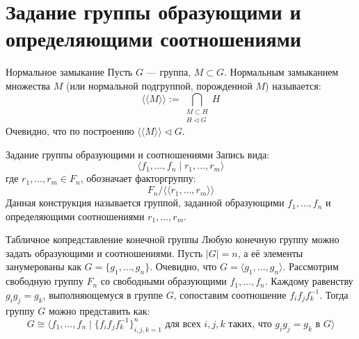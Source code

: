 
\section{Задание группы образующими и определяющими соотношениями}

\begin{Definition}{Нормальное замыкание}{}
	Пусть $G$ — группа, $M \subset G$.
	Нормальным замыканием множества $M$ (или нормальной подгруппой, порожденной $M$) называется:
	\[ \langle\langle M \rangle\rangle := \bigcap_{\substack{M \subset H \\ H \triangleleft G}} H \]
	Очевидно, что по построению $\langle\langle M \rangle\rangle \triangleleft G$.
\end{Definition}

\begin{Definition}{Задание группы образующими и соотношениями}{}
	Запись вида:
	\[ \langle f_1, \dots, f_n \mid r_1, \dots, r_m \rangle \]
	где $r_1, \dots, r_m \in F_n$, обозначает факторгруппу:
	\[ F_n / \langle\langle r_1, \dots, r_m \rangle\rangle \]
	Данная конструкция называется группой, заданной образующими $f_1, \dots, f_n$ и определяющими соотношениями $r_1, \dots, r_m$.
\end{Definition}

\begin{Remark}{Табличное копредставление конечной группы}{}
	Любую конечную группу можно задать образующими и соотношениями.
	Пусть $|G| = n$, а её элементы занумерованы как $G = \{g_1, \dots, g_n\}$. Очевидно, что $G = \langle g_1, \dots, g_n \rangle$.
	Рассмотрим свободную группу $F_n$ со свободными образующими $f_1, \dots, f_n$. Каждому равенству $g_i g_j = g_k$, выполняющемуся в группе $G$, сопоставим соотношение $f_i f_j f_k^{-1}$. Тогда группу $G$ можно представить как:
	\[ G \cong \langle f_1, \dots, f_n \mid \{ f_i f_j f_k^{-1} \}_{i,j,k=1}^n \text{ для всех } i,j,k \text{ таких, что } g_i g_j = g_k \text{ в } G \rangle \]
\end{Remark}

